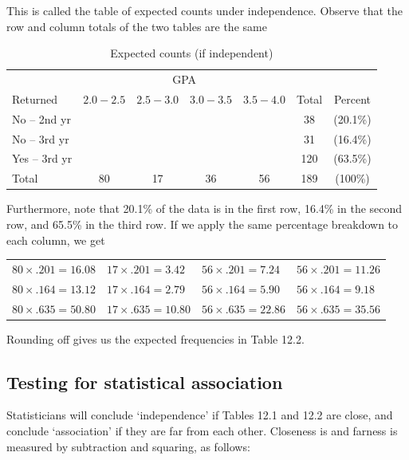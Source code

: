 \documentclass[11pt, chapterprefix=true]{scrbook}\usepackage[]{graphicx}\usepackage[]{color}
\begin{document}
This is called the table of expected counts under independence.  Observe that the row and column totals of the two tables are the same

\begin{table}[ht]
\centering
\caption{Expected counts (if independent)}
\begin{tabular}{@{} lcccccc @{}} \hline
& \multicolumn{4}{c}{GPA} \\
Returned & $2.0-2.5$ & $2.5-3.0$ & $3.0-3.5$ & $3.5-4.0$ & Total & Percent \\ \hline
No -- 2nd yr &  &  &  &  & 38 & (20.1\%) \\
No -- 3rd yr &  &  &  &  & 31 & (16.4\%)\\
Yes -- 3rd yr &  &  &  &  & 120 & (63.5\%) \\ \hline
Total        & 80 & 17 & 36 & 56 & 189 & (100\%) \\
\end{tabular}
\end{table}

Furthermore, note that 20.1\% of the data is in the first row, 16.4\% in the second row, and 65.5\% in the third row.  If we apply the same percentage breakdown to each column, we get

\begin{table}
\centering
\begin{tabular}{@{} llll @{}} \hline
$80 \times .201 = 16.08$ & $17 \times .201 = 3.42$ & $56 \times .201 = 7.24$ & $56 \times .201 = 11.26$  \\
$80 \times .164 = 13.12$ & $17 \times .164 = 2.79$ & $56 \times .164 = 5.90$ & $56 \times .164 = 9.18$  \\
$80 \times .635 = 50.80$ & $17 \times .635 = 10.80$ & $56 \times .635 = 22.86$ & $56 \times .635 = 35.56$  \\ \hline
\end{tabular}
\end{table}

Rounding off gives us the expected frequencies in Table 12.2.

\subsection{Testing for statistical association}

Statisticians will conclude `independence' if Tables 12.1 and 12.2 are close, and conclude `association' if they are far from each other.   Closeness is and farness is measured by subtraction and squaring, as follows:
\end{document}
